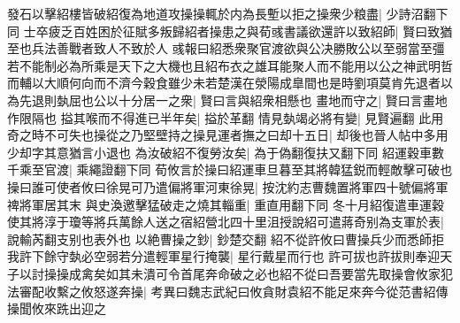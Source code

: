 發石以擊紹樓皆破紹復為地道攻操操輒於内為長塹以拒之操衆少粮盡|{
	少詩沼翻下同}
士卒疲乏百姓困於征賦多叛歸紹者操患之與荀彧書議欲還許以致紹師|{
	賢曰致猶至也兵法善戰者致人不致於人}
彧報曰紹悉衆聚官渡欲與公决勝敗公以至弱當至彊若不能制必為所乘是天下之大機也且紹布衣之雄耳能聚人而不能用以公之神武明哲而輔以大順何向而不濟今穀食雖少未若楚漢在滎陽成臯間也是時劉項莫肯先退者以為先退則埶屈也公以十分居一之衆|{
	賢曰言與紹衆相懸也}
畫地而守之|{
	賢曰言畫地作限隔也}
搤其喉而不得進已半年矣|{
	搤於革翻}
情見埶竭必將有變|{
	見賢遍翻}
此用奇之時不可失也操從之乃堅壁持之操見運者撫之曰却十五日|{
	却後也晉人帖中多用少却字其意猶言小退也}
為汝破紹不復勞汝矣|{
	為于偽翻復扶又翻下同}
紹運穀車數千乘至官渡|{
	乘繩證翻下同}
荀攸言於操曰紹運車旦暮至其將韓猛鋭而輕敵擊可破也操曰誰可使者攸曰徐晃可乃遣偏將軍河東徐晃|{
	按沈約志曹魏置將軍四十號偏將軍禆將軍居其末}
與史渙邀擊猛破走之燒其輜重|{
	重直用翻下同}
冬十月紹復遣車運穀使其將淳于瓊等將兵萬餘人送之宿紹營北四十里沮授說紹可遣蔣奇别為支軍於表|{
	說輸芮翻支别也表外也}
以絶曹操之鈔|{
	鈔楚交翻}
紹不從許攸曰曹操兵少而悉師拒我許下餘守埶必空弱若分遣輕軍星行掩襲|{
	星行戴星而行也}
許可拔也許拔則奉迎天子以討操操成禽矣如其未潰可令首尾奔命破之必也紹不從曰吾要當先取操會攸家犯法審配收繫之攸怒遂奔操|{
	考異曰魏志武紀曰攸貪財袁紹不能足來奔今從范書紹傳}
操聞攸來跣出迎之

